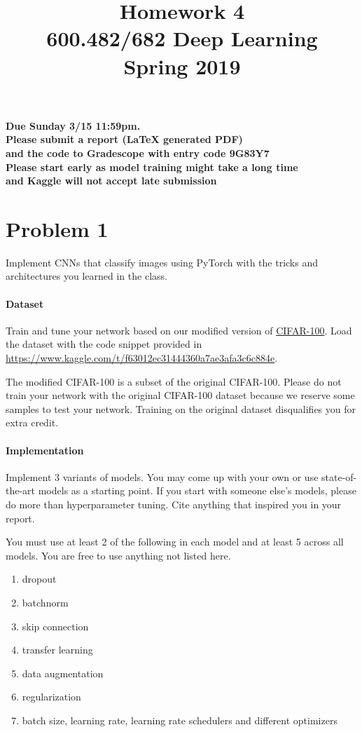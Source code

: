 \documentclass[a4paper]{article}
\title{Homework 4\\
600.482/682 Deep Learning\\
Spring 2019}
\begin{document}
\maketitle

\begin{center}
\textbf{Due Sunday 3/15 11:59pm.\\
Please submit a report (LaTeX generated PDF) \\ and the code to Gradescope with entry code 9G83Y7 \\
Please start early as model training might take a long time \\
and Kaggle will not accept late submission}

\end{center}

\section{Problem 1}

Implement CNNs that classify images using PyTorch with the tricks and architectures you learned in the class.

\paragraph{Dataset} Train and tune your network based on our modified version of \href{https://www.cs.toronto.edu/~kriz/cifar.html}{CIFAR-100}. Load the dataset with the code snippet provided in \url{https://www.kaggle.com/t/f63012ec31444360a7ae3afa3c6c884e}.

The modified CIFAR-100 is a subset of the original CIFAR-100. Please do not train your network with the original CIFAR-100 dataset because we reserve some samples to test your network. Training on the original dataset disqualifies you for extra credit.

\paragraph{Implementation} Implement 3 variants of models. You may come up with your own or use state-of-the-art models as a starting point. If you start with someone else's models, please do more than hyperparameter tuning. Cite anything that inspired you in your report. 

You must use at least 2 of the following in each model and at least 5 across all models. You are free to use anything not listed here.

\begin{enumerate}
\item dropout
\item batchnorm
\item skip connection
\item transfer learning
\item data augmentation
\item regularization
\item batch size, learning rate, learning rate schedulers and different optimizers
\end{enumerate}
\end{document}
